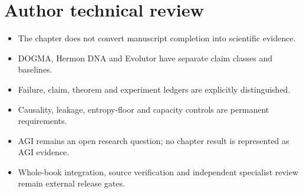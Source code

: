 \chapter*{Author technical review}
\begin{itemize}
\item The chapter does not convert manuscript completion into scientific evidence.
\item DOGMA, Hermon DNA and Evolutor have separate claim classes and baselines.
\item Failure, claim, theorem and experiment ledgers are explicitly distinguished.
\item Causality, leakage, entropy-floor and capacity controls are permanent requirements.
\item AGI remains an open research question; no chapter result is represented as AGI evidence.
\item Whole-book integration, source verification and independent specialist review remain external release gates.
\end{itemize}